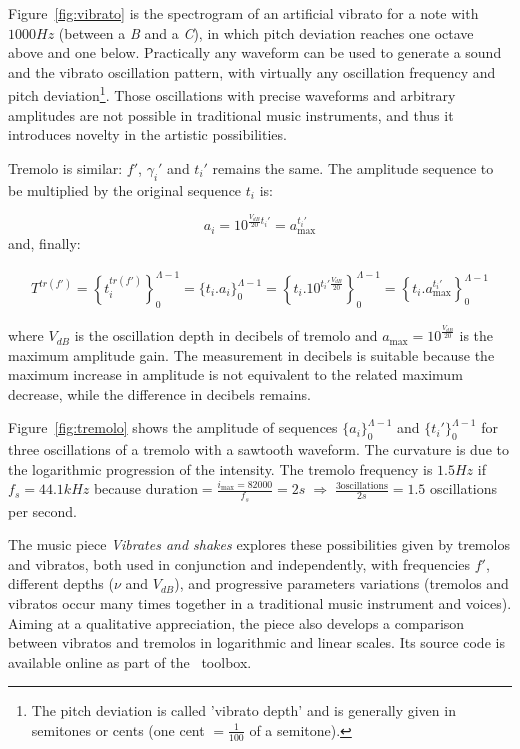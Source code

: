 Figure~\ref{fig:vibrato} is the spectrogram of an artificial vibrato for a note with $1000Hz$ (between a \emph{B} and a \emph{C}), in which pitch deviation reaches one octave above and one below. Practically any waveform can be used to generate a sound and the vibrato oscillation pattern, with virtually any oscillation frequency and pitch deviation\footnote{The pitch deviation is called 'vibrato depth' and is generally given in semitones or cents (one cent $= \frac{1}{100}$ of a semitone).}.
Those oscillations with precise waveforms and arbitrary amplitudes are not possible in traditional music instruments, and thus it introduces novelty in the artistic possibilities.

Tremolo is similar: $f'$, $\gamma_i'$ and $t_i'$ remains the same.
The amplitude sequence to be multiplied by the original sequence $t_i$ is:

\begin{equation}\label{trA}
 a_i=10^{\frac{V_{dB}}{20}t_i' } = a_{\text{max}}^{t_i'}
\end{equation}
\noindent and, finally: 

\begin{equation}\label{trT}
\begin{split}
 T^{tr(f')}=\left \{ t_i^{tr(f')} \right \}_0^{\Lambda-1}=\{ t_i . a_i \}_0^{\Lambda-1}= \left \{t_i .10^{t_i' \frac{V_{dB}}{20}}    \right \}_0^{\Lambda-1}=\left\{t_i . a_{\text{max}}^{t_i'} \right\}_0^{\Lambda-1}
\end{split}
\end{equation}

\noindent where $V_{dB}$ is the oscillation depth in decibels of tremolo and $a_{\text{max}}=10^{\frac{V_{dB}}{20}}$ is the maximum amplitude gain. The measurement in decibels is suitable because the maximum increase in amplitude is not equivalent to the related maximum decrease, while the difference in decibels remains.

Figure~\ref{fig:tremolo} shows the amplitude of sequences $\{a_i\}_0^{\Lambda-1}$ and $\{t_i'\}_0^{\Lambda-1}$ for three oscillations of a tremolo with a sawtooth waveform. The curvature is due to the logarithmic progression of the intensity. The tremolo frequency is $1.5Hz$ if $f_s=44.1kHz$ because $\text{duration} = \frac{i_{\text{max}}=82000}{f_s}= 2s \; \Rightarrow \; \frac{3\text{oscillations}}{2s}=1.5$ oscillations per second.

The music piece \emph{Vibrates and shakes} explores these possibilities given by tremolos and vibratos, both used in conjunction and independently, with frequencies $f'$, different depths ($\nu$ and $V_{dB}$), and progressive parameters variations (tremolos and vibratos occur many times together in a traditional music instrument and voices). Aiming at a qualitative appreciation, the piece also develops a comparison between vibratos and tremolos in logarithmic and linear scales. Its source code is available online as part of the \massa\ toolbox.

